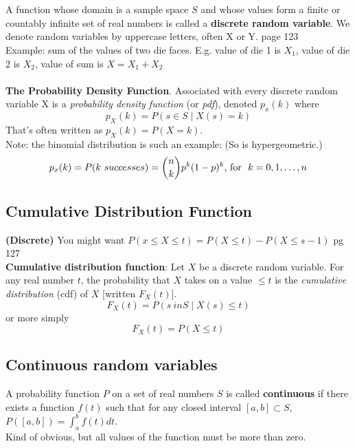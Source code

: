      \hfill \\  
  \hfill \\  
A function whose domain is a sample space $S$ and whose values form a finite or countably infinite set of real numbers is called a \textbf{discrete random variable}.  We denote random variables by uppercase letters, often X or Y.  {\tiny page 123}  \hfill \\
Example: sum of the values of two die faces.  E.g. value of die 1 is $X_1$, value of die 2 is $X_2$, value of sum is $X = X_1 + X_2$    \hfill \\  
  \hfill \\  
  
\textbf{The Probability Density Function}.  Associated with every discrete random variable X is a \textit{probability density function} (or \textit{pdf}), denoted $p_x(k)$ where 
	\[  p_X(k) = P({s \in S \mid X(s) = k})  \]
That's often written as $ p_X(k) = P(X = k) $.  \hfill \\  
Note: the binomial distribution is such an example:   (So is hypergeometric.) 
	\[  p_x(k) = P(k \mbox \ successes) = {{n}\choose{k}}p^k(1-p)^k \mbox{, for \ } k = 0, 1, \dots, n \]

\subsection{Cumulative Distribution Function} \textbf{(Discrete)}
You might want $P(x \leq X \leq t) = P(X \leq t) - P(X \leq s - 1)$  {\tiny pg 127}  \hfill \\  
\textbf{Cumulative distribution function}:  Let $X$ be a discrete random variable.  For any real number $t$, the probability that $X$ takes on a value $\leq t$ is the \textit{cumulative distribution} (cdf) of $X$ [written $F_X(t)$].
	\[ F_X(t) = P({s \ in S \mid X(s) \leq t}) \]
or more simply 
	\[  F_X(t) = P(X \leq t)  \]
	
\subsection{Continuous random variables}
A probability function $P$ on a set of real numbers $S$ is called \textbf{continuous} if there exists a function $f(t)$ such that for any closed interval $[a, b] \subset S$, $P([a, b]) = \int_{a}^{b} f(t)dt$. \hfill \\  
Kind of obvious, but all values of the function must be more than zero.  \hfill \\  

